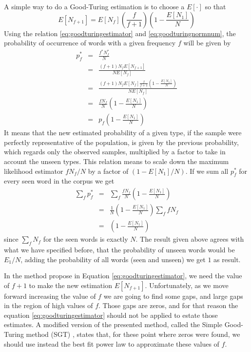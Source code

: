 A simple way to do a Good-Turing estimation \citep{galesampson95} is to choose a $E[\cdot]$ so that
\begin{equation}
\label{eq:goodturingestimator}
E[N_{f+1}] = E[N_f] \left( \frac{f}{f+1} \right) \left( 1 - \frac{E[N_1]}{N} \right)
\end{equation}
Using the relation \ref{eq:goodturingestimator} and \ref{eq:goodturingnormnum}, 
the probability of occurrence of words with a given frequency $f$
will be given by
\begin{eqnarray}
p^\ast_f &=& \frac{f^\ast N_f^\ast}{N} \nonumber \\
    &=& \frac{(f+1) N_f E[N_{f+1}]}{N E[N_f]} \nonumber \\
    &=& \frac{(f+1) N_f E[N_f] \frac{f}{f+1} \left( 1 - \frac{E[N_1]}{N} \right)}{N E[N_f]} \nonumber \\
    &=& \frac{f N_f}{N} \left( 1 - \frac{E[N_1]}{N} \right) \nonumber \\
    &=& p_f \left( 1 - \frac{E[N_1]}{N} \right)
\end{eqnarray}
It means that the new estimated probability of a given type, if the sample were
perfectly representative of the population, is given by the previous probability,
which regards only the observed samples, multiplied by a factor to take in account 
the unseen types.
This relation means to scale down the maximum likelihood estimator $f N_f/N$ by a factor of $(1 - E[N_1]/N)$.
If we sum all $p^\ast_f$ for every seen word in the corpus we get
\begin{eqnarray}
\sum_f p^\ast_f &=& \sum_f \frac{f N_f}{N} \left( 1 - \frac{E[N_1]}{N} \right) \nonumber \\
           &=& \frac{1}{N} \left( 1 - \frac{E[N_1]}{N} \right) \sum_f f N_f \nonumber \\
           &=& \left( 1 - \frac{E[N_1]}{N} \right)
\end{eqnarray}
since $\sum_f N_f$ for the seen words is exactly $N$. The result given above agrees with
what we have specified before, that the probability of unseen words would be $E_1/N$,
adding the probability of all words (seen and unseen) we get $1$ as result. 

In the method propose in Equation \ref{eq:goodturingestimator}, we need the value of 
$f+1$ to make the new estimation $E[N_{f+1}]$. Unfortunately, as we move forward
increasing the value of $f$ we are going to find some gaps, and large gaps
in the region of high values of $f$. Those gaps are zeros, and for that reason
the equation \ref{eq:goodturingestimator} should not be applied to estate those estimates.
A modified version of the presented method, called the Simple Good-Turing method (SGT) \citep{gale1994},
states that, for these point where zeros were found, we should use instead the best fit power law
to approximate these values of $f$.

